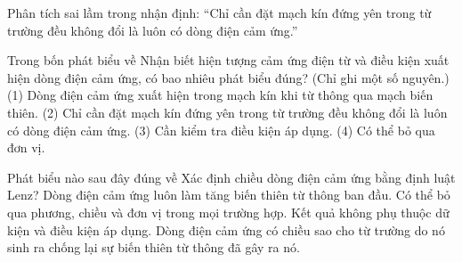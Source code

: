 \begin{bt}
Phân tích sai lầm trong nhận định: “Chỉ cần đặt mạch kín đứng yên trong từ trường đều không đổi là luôn có dòng điện cảm ứng.”
\end{bt}

\begin{ex}
Trong bốn phát biểu về Nhận biết hiện tượng cảm ứng điện từ và điều kiện xuất hiện dòng điện cảm ứng, có bao nhiêu phát biểu đúng? (Chỉ ghi một số nguyên.) (1) Dòng điện cảm ứng xuất hiện trong mạch kín khi từ thông qua mạch biến thiên. (2) Chỉ cần đặt mạch kín đứng yên trong từ trường đều không đổi là luôn có dòng điện cảm ứng. (3) Cần kiểm tra điều kiện áp dụng. (4) Có thể bỏ qua đơn vị.
\end{ex}

\begin{ex}
Phát biểu nào sau đây đúng về Xác định chiều dòng điện cảm ứng bằng định luật Lenz?
\choice
{Dòng điện cảm ứng luôn làm tăng biến thiên từ thông ban đầu.}
{Có thể bỏ qua phương, chiều và đơn vị trong mọi trường hợp.}
{Kết quả không phụ thuộc dữ kiện và điều kiện áp dụng.}
{\True Dòng điện cảm ứng có chiều sao cho từ trường do nó sinh ra chống lại sự biến thiên từ thông đã gây ra nó.}
\end{ex}

